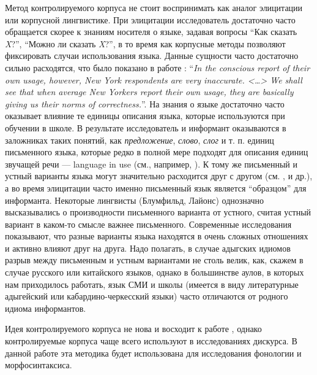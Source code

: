 Метод контролируемого корпуса не стоит воспринимать как аналог элицитации или корпусной лингвистике. При элицитации исследователь достаточно часто обращается скорее к знаниям носителя о языке, задавая вопросы ``Как сказать \textit{X}?'', ``Можно ли сказать \textit{X}?'', в то время как корпусные методы позволяют фиксировать случаи использования языка. Данные сущности часто достаточно сильно расходятся, что было показано в работе \citep[300]{labov64}: ``\textit{In the conscious report of their own usage, however, New York respondents are very inaccurate. <\dots> We shall see that when average New Yorkers report their own usage, they are basically giving us their norms of correctness.}''. На знания о языке достаточно часто оказывает влияние те единицы описания языка, которые используются при обучении в школе. В результате исследователь и информант оказываются в заложниках таких понятий, как \textit{предложение}, \textit{слово}, \textit{слог} и т. п. единиц письменного языка, которые редко в полной мере подходят для описания единиц звучащей речи --- language in use (см., например, \citep{miller98}). К тому же письменный и устный варианты языка могут значительно расходится друг с другом (см. \cite[40-42]{lyons68}, \citep{tannen82} и др.), а во время элицитации часто именно письменный язык является ``образцом'' для информанта. Некоторые лингвисты (Блумфильд, Лайонс) однозначно высказывались о производности письменного варианта от устного, считая устный вариант в каком-то смысле важнее письменного. Современные исследования показывают, что разные варианты языка находятся в очень сложных отношениях и активно влияют друг на друга. Надо полагать, в случае адыгских идиомов разрыв между письменным и устным вариантами не столь велик, как, скажем в случае русского или китайского языков, однако в большинстве аулов, в которых нам приходилось работать, язык СМИ и школы (имеется в виду литературные адыгейский или кабардино-черкесский языки) часто отличаются от родного идиома информантов.
\par Идея контролируемого корпуса не нова и восходит к работе \citep{chafe80}, однако контролируемые корпуса чаще всего используют в исследованиях дискурса. В данной работе эта методика будет использована для исследования фонологии и морфосинтаксиса.

